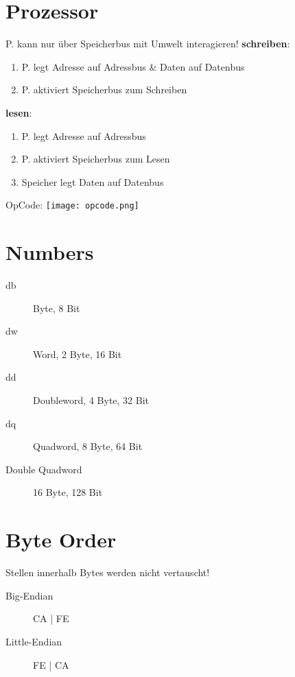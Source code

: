 

\newcommand{\TITLE}{Betriebssysteme 1}
\newcommand{\AUTHOR}{Mona Panchaud}
\newcommand{\INSTITUTE}{Ostschweizer Fachhochschule}

\begin{multicols*}{4}

\section{Prozessor}
P. kann nur über Speicherbus mit Umwelt interagieren!
\textbf{schreiben}:
\begin{enumerate}
    \item P. legt Adresse auf Adressbus \& Daten auf Datenbus
    \item P. aktiviert Speicherbus zum Schreiben
\end{enumerate}
\textbf{lesen}:
\begin{enumerate}
    \item P. legt Adresse auf Adressbus
    \item P. aktiviert Speicherbus zum Lesen
    \item Speicher legt Daten auf Datenbus
\end{enumerate}
OpCode: \texttt{[image: opcode.png]}

\section{Numbers}
\begin{description}
    \item[db] Byte, 8 Bit
    \item[dw] Word, 2 Byte, 16 Bit
    \item[dd] Doubleword, 4 Byte, 32 Bit
    \item[dq] Quadword, 8 Byte, 64 Bit
    \item [Double Quadword] 16 Byte, 128 Bit
\end{description}

\section{Byte Order}
Stellen innerhalb Bytes werden nicht vertauscht!
\begin{description}
    \item[Big-Endian] CA | FE
    \item[Little-Endian] FE | CA
\end{description}


\end{multicols*}
